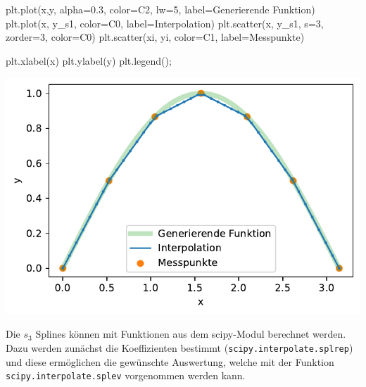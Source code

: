 \documentclass[
  letterpaper,
  DIV=11,
  numbers=noendperiod]{scrreprt}
\newenvironment{Shaded}{\begin{snugshade}}{\end{snugshade}}
\newcommand{\DecValTok}[1]{\textcolor[rgb]{0.68,0.00,0.00}{#1}}
\newcommand{\FloatTok}[1]{\textcolor[rgb]{0.68,0.00,0.00}{#1}}
\newcommand{\NormalTok}[1]{\textcolor[rgb]{0.00,0.23,0.31}{#1}}
\newcommand{\OperatorTok}[1]{\textcolor[rgb]{0.37,0.37,0.37}{#1}}
\newcommand{\StringTok}[1]{\textcolor[rgb]{0.13,0.47,0.30}{#1}}
\begin{document}
\begin{Shaded}
\begin{Highlighting}[]
\NormalTok{plt.plot(x,y, alpha}\OperatorTok{=}\FloatTok{0.3}\NormalTok{, color}\OperatorTok{=}\StringTok{\textquotesingle{}C2\textquotesingle{}}\NormalTok{, lw}\OperatorTok{=}\DecValTok{5}\NormalTok{, }
\NormalTok{         label}\OperatorTok{=}\StringTok{\textquotesingle{}Generierende Funktion\textquotesingle{}}\NormalTok{)}
\NormalTok{plt.plot(x, y\_s1, color}\OperatorTok{=}\StringTok{\textquotesingle{}C0\textquotesingle{}}\NormalTok{, label}\OperatorTok{=}\StringTok{\textquotesingle{}Interpolation\textquotesingle{}}\NormalTok{)}
\NormalTok{plt.scatter(x, y\_s1, s}\OperatorTok{=}\DecValTok{3}\NormalTok{, zorder}\OperatorTok{=}\DecValTok{3}\NormalTok{, color}\OperatorTok{=}\StringTok{\textquotesingle{}C0\textquotesingle{}}\NormalTok{)}
\NormalTok{plt.scatter(xi, yi, color}\OperatorTok{=}\StringTok{\textquotesingle{}C1\textquotesingle{}}\NormalTok{, label}\OperatorTok{=}\StringTok{\textquotesingle{}Messpunkte\textquotesingle{}}\NormalTok{)}

\NormalTok{plt.xlabel(}\StringTok{\textquotesingle{}x\textquotesingle{}}\NormalTok{)}
\NormalTok{plt.ylabel(}\StringTok{\textquotesingle{}y\textquotesingle{}}\NormalTok{)}
\NormalTok{plt.legend()}\OperatorTok{;}
\end{Highlighting}
\end{Shaded}

\includegraphics{books/dataanalysis/splines_files/figure-pdf/cell-6-output-1.pdf}

Die \(s_3\) Splines können mit Funktionen aus dem scipy-Modul berechnet
werden. Dazu werden zunächst die Koeffizienten bestimmt
(\texttt{scipy.interpolate.splrep}) und diese ermöglichen die gewünschte
Auswertung, welche mit der Funktion \texttt{scipy.interpolate.splev}
vorgenommen werden kann.
\end{document}

